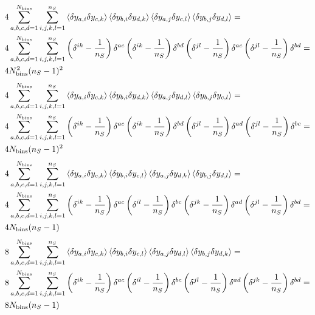 \begin{align}
& 4 \sum_{a,b,c,d=1}^{N_{\rm bins}} \sum_{i,j,k,l=1}^{n_S} \left\langle \delta y_{a,i} \delta y_{c,k} \right\rangle \left\langle \delta y_{b,i} \delta y_{d,k} \right\rangle \left\langle \delta y_{a,j} \delta y_{c,l} \right\rangle \left\langle \delta y_{b,j} \delta y_{d,l} \right\rangle = \nonumber \\
& 4 \sum_{a,b,c,d=1}^{N_{\rm bins}} \sum_{i,j,k,l=1}^{n_S} \left( \delta^{ik} - \frac1{n_S} \right) \delta^{ac} \left( \delta^{ik} - \frac1{n_S} \right) \delta^{bd} \left( \delta^{jl} - \frac1{n_S} \right) \delta^{ac} \left( \delta^{jl} - \frac1{n_S} \right) \delta^{bd} = \nonumber \\
& 4 N_{\rm bins}^2 (n_S-1)^2
\end{align}
\begin{align}
& 4 \sum_{a,b,c,d=1}^{N_{\rm bins}} \sum_{i,j,k,l=1}^{n_S} \left\langle \delta y_{a,i} \delta y_{c,k} \right\rangle \left\langle \delta y_{b,i} \delta y_{d,k} \right\rangle \left\langle \delta y_{a,j} \delta y_{d,l} \right\rangle \left\langle \delta y_{b,j} \delta y_{c,l} \right\rangle = \nonumber \\
& 4 \sum_{a,b,c,d=1}^{N_{\rm bins}} \sum_{i,j,k,l=1}^{n_S} \left( \delta^{ik} - \frac1{n_S} \right) \delta^{ac} \left( \delta^{ik} - \frac1{n_S} \right) \delta^{bd} \left( \delta^{jl} - \frac1{n_S} \right) \delta^{ad} \left( \delta^{jl} - \frac1{n_S} \right) \delta^{bc} = \nonumber \\
& 4 N_{\rm bins} (n_S-1)^2
\end{align}
\begin{align}
& 4 \sum_{a,b,c,d=1}^{N_{\rm bins}} \sum_{i,j,k,l=1}^{n_S} \left\langle \delta y_{a,i} \delta y_{c,k} \right\rangle \left\langle \delta y_{b,i} \delta y_{c,l} \right\rangle \left\langle \delta y_{a,j} \delta y_{d,k} \right\rangle \left\langle \delta y_{b,j} \delta y_{d,l} \right\rangle = \nonumber \\
& 4 \sum_{a,b,c,d=1}^{N_{\rm bins}} \sum_{i,j,k,l=1}^{n_S} \left( \delta^{ik} - \frac1{n_S} \right) \delta^{ac} \left( \delta^{il} - \frac1{n_S} \right) \delta^{bc} \left( \delta^{jk} - \frac1{n_S} \right) \delta^{ad} \left( \delta^{jl} - \frac1{n_S} \right) \delta^{bd} = \nonumber \\
& 4 N_{\rm bins} (n_S-1)
\end{align}
\begin{align}
& 8 \sum_{a,b,c,d=1}^{N_{\rm bins}} \sum_{i,j,k,l=1}^{n_S} \left\langle \delta y_{a,i} \delta y_{c,k} \right\rangle \left\langle \delta y_{b,i} \delta y_{c,l} \right\rangle \left\langle \delta y_{a,j} \delta y_{d,l} \right\rangle \left\langle \delta y_{b,j} \delta y_{d,k} \right\rangle = \nonumber \\
& 8 \sum_{a,b,c,d=1}^{N_{\rm bins}} \sum_{i,j,k,l=1}^{n_S} \left( \delta^{ik} - \frac1{n_S} \right) \delta^{ac} \left( \delta^{il} - \frac1{n_S} \right) \delta^{bc} \left( \delta^{jl} - \frac1{n_S} \right) \delta^{ad} \left( \delta^{jk} - \frac1{n_S} \right) \delta^{bd} = \nonumber \\
& 8 N_{\rm bins} (n_S-1)
\end{align}
